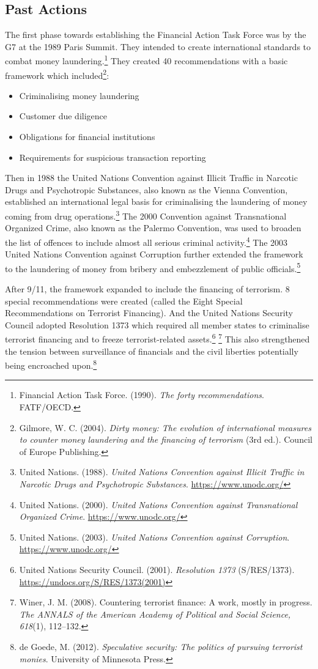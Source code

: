 \subsection{Past Actions}

The first phase towards establishing the Financial Action Task Force was by the G7 at the 1989 Paris Summit. They intended to create international standards to combat money laundering.\footnote{Financial Action Task Force. (1990). \emph{The forty recommendations}. FATF/OECD.} They created 40 recommendations with a basic framework which included\footnote{Gilmore, W. C. (2004). \emph{Dirty money: The evolution of international measures to counter money laundering and the financing of terrorism} (3rd ed.). Council of Europe Publishing.}:

\begin{itemize}
  \item Criminalising money laundering
  \item Customer due diligence
  \item Obligations for financial institutions
  \item Requirements for suspicious transaction reporting
\end{itemize}

Then in 1988 the United Nations Convention against Illicit Traffic in Narcotic Drugs and Psychotropic Substances, also known as the Vienna Convention, established an international legal basis for criminalising the laundering of money coming from drug operations.\footnote{United Nations. (1988). \emph{United Nations Convention against Illicit Traffic in Narcotic Drugs and Psychotropic Substances}. \url{https://www.unodc.org/}} The 2000 Convention against Transnational Organized Crime, also known as the Palermo Convention, was used to broaden the list of offences to include almost all serious criminal activity.\footnote{United Nations. (2000). \emph{United Nations Convention against Transnational Organized Crime}. \url{https://www.unodc.org/}} The 2003 United Nations Convention against Corruption further extended the framework to the laundering of money from bribery and embezzlement of public officials.\footnote{United Nations. (2003). \emph{United Nations Convention against Corruption}. \url{https://www.unodc.org/}}

After 9/11, the framework expanded to include the financing of terrorism. 8 special recommendations were created (called the Eight Special Recommendations on Terrorist Financing). And the United Nations Security Council adopted Resolution 1373 which required all member states to criminalise terrorist financing and to freeze terrorist-related assets.\footnote{United Nations Security Council. (2001). \emph{Resolution 1373} (S/RES/1373). \url{https://undocs.org/S/RES/1373(2001)}} \footnote{Winer, J. M. (2008). Countering terrorist finance: A work, mostly in progress. \emph{The ANNALS of the American Academy of Political and Social Science, 618}(1), 112–132.} This also strengthened the tension between surveillance of financials and the civil liberties potentially being encroached upon.\footnote{de Goede, M. (2012). \emph{Speculative security: The politics of pursuing terrorist monies}. University of Minnesota Press.}

